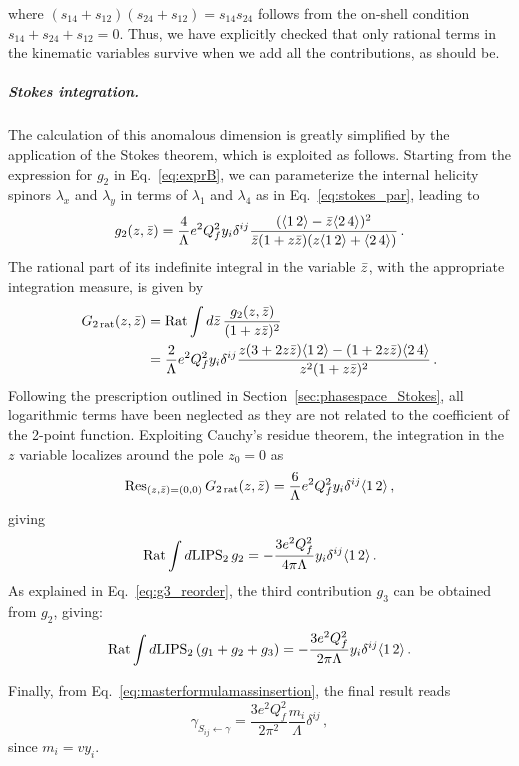 where $(s_{14}+s_{12})(s_{24}+s_{12})=s_{14}s_{24}$ follows from the on-shell condition $s_{14}+s_{24}+s_{12}=0$.
Thus, we have explicitly checked that only rational terms in the kinematic variables survive when we add all the contributions, as should be.

\subparagraph{Stokes integration.}
%
The calculation of this anomalous dimension is greatly simplified by the application of the Stokes theorem, which is exploited as follows.
Starting from the expression for $g_2$ in Eq.~\eqref{eq:exprB}, we can parameterize the internal helicity spinors $\lambda_x$ and $\lambda_y$ in terms of $\lambda_1$ and $\lambda_4$ as in Eq.~\eqref{eq:stokes_par},
leading to 
\begin{equation}
    g_2(z,\bar{z}) = \frac{4}{\Lambda}e^2 Q_f^2 y_i\delta^{ij}\frac{(\langle1\, 2 \rangle-\bar{z} \langle2\, 4 \rangle)^2}{\bar{z} (1+z\bar{z} )(z\langle1\, 2 \rangle+\langle2\, 4 \rangle)}\,.
\end{equation}
The rational part of its indefinite integral in the variable $\bar{z}$, with the appropriate integration measure, is given by
\begin{align}
  G_{2\,\text{rat}}(z,\bar{z}) 
  &= \text{Rat}  \int d \bar{z}\, \frac{g_2(z,\bar{z})}{(1+z\bar{z})^2}  \nonumber \\
  &= \frac{2}{\Lambda}e^2 Q_f^2 y_i\delta^{ij} \frac{z(3+2z\bar{z})\langle1\, 2 \rangle-(1+2z\bar{z})\langle2\, 4 \rangle}{z^2(1+z\bar{z})^2}\, . 
\end{align}
Following the prescription outlined in Section~\ref{sec:phasespace_Stokes}, all logarithmic terms have been neglected as they are not related to the coefficient of the 2-point function.
Exploiting Cauchy's residue theorem, the integration in the $z$ variable localizes around the pole $z_0=0$ as
\begin{equation}
    \Res_{(z,\zb) = (0,0)}G_{2\,\text{rat}}(z,\zb) =  \frac{6}{\Lambda}e^2 Q_f^2 y_i\delta^{ij}\agl{1}{2} \, , 
\end{equation}
giving
\begin{equation}
   {\rm Rat}\int d\mathrm{LIPS}_2\, g_2 
   =  -\frac{3 e^2 Q_f^2}{4\pi\Lambda}y_i\delta^{ij}\langle1\, 2 \rangle \,.
   \label{eq:g2_contr}
\end{equation}
As explained in Eq.~\eqref{eq:g3_reorder}, the third contribution $g_3$ can be obtained from $g_2$, giving:
\begin{equation}
{\rm Rat}\int d\text{LIPS}_2\,(g_1+g_2+g_3) =  -\frac{3 e^2 Q_f^2}{2\pi\Lambda}y_i\delta^{ij}\langle1\, 2 \rangle \,.
   \label{eq:g3_contr}
\end{equation}

Finally, from Eq.~\eqref{eq:masterformulamassinsertion}, the final result reads
\begin{equation}
\gamma_{S_{ij}\leftarrow\gamma} = \frac{3e^2Q_f^2}{2\pi^2}\frac{m_i}{\Lambda}\delta^{ij}\,,
\label{eq:result_phiffb}
\end{equation}
since $m_i=vy_i$.

